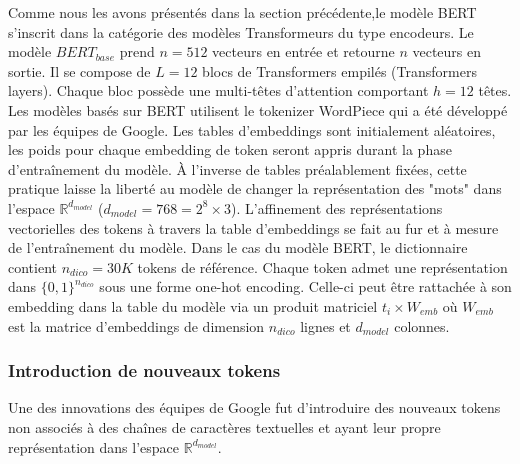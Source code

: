 \documentclass[12pt]{article}
\theoremstyle{definition}
\begin{document}
Comme nous les avons présentés dans la section précédente,le modèle BERT s’inscrit dans la catégorie des modèles Transformeurs du type encodeurs. Le modèle $BERT_{base}$ prend $n=512$ vecteurs en entrée et retourne $n$ vecteurs en sortie. Il se compose de $L=12$ blocs de Transformers empilés (Transformers layers). Chaque bloc possède une multi-têtes d’attention comportant $h=12$ têtes. Les modèles basés sur BERT utilisent le tokenizer WordPiece qui a été développé par les équipes de Google. Les tables d'embeddings sont initialement aléatoires, les poids pour chaque embedding de token seront appris durant la phase d’entraînement du modèle. À l’inverse de tables préalablement fixées, cette pratique laisse la liberté au modèle de changer la représentation des "mots" dans l’espace $\mathbb{R}^{d_{model}}$ ($d_{model} = 768 = 2^8 \times 3$). L’affinement des représentations vectorielles des tokens à travers la table d'embeddings se fait au fur et à mesure de l’entraînement du modèle. Dans le cas du modèle BERT, le dictionnaire contient $n_{dico} = 30K$ tokens de référence. Chaque token admet une représentation dans $\{0,1\}^{n_{dico}}$ sous une forme one-hot encoding. Celle-ci peut être rattachée à son embedding dans la table du modèle via un produit matriciel $t_{i} \times W_{emb}$ où $W_{emb}$ est la matrice d'embeddings de dimension $n_{dico}$ lignes et $d_{model}$ colonnes.


\subsubsection{Introduction de nouveaux tokens}

Une des innovations des équipes de Google fut d'introduire des nouveaux tokens non associés à des chaînes de caractères textuelles et ayant leur propre représentation dans l'espace $\mathbb{R}^{d_{model}}$.  
\end{document}
